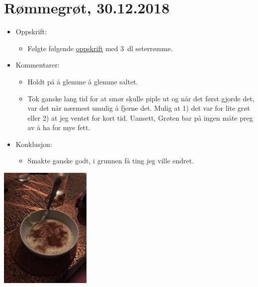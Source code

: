 \documentclass[12pt]{article}
\begin{document}
\section*{R{\o}mmegr{\o}t, 30.12.2018}
\begin{itemize}
\item Oppskrift:
  \begin{itemize}
  \item F{\o}lgte f{\o}lgende
    \href{https://www.matprat.no/oppskrifter/tradisjon/rommegrot/}{oppskrift}
    med 3~dl seterr{\o}mme.  
  \end{itemize}
\item Kommentarer:
  \begin{itemize}
  \item Holdt p{\aa} {\aa} glemme {\aa} glemme saltet.        
  \item Tok ganske lang tid for at sm{\o}r skulle piple ut og
    n{\aa}r det f{\o}rst gjorde det, var det n{\aa}r n{\ae}rmest umulig
    {\aa} fjerne det. Mulig at 1) det var for lite gr{\o}t eller
    2) at jeg ventet for kort tid. Uansett, Gr{\o}ten bar p{\aa}
    ingen m{\aa}te preg av {\aa} ha for mye fett.
  \end{itemize}
\item Konklusjon:
  \begin{itemize}
  \item Smakte ganske godt, i grunnen f{\aa} ting jeg ville endret.
  \end{itemize}
\end{itemize}
\centering
\includegraphics[width=0.33\textwidth]{30-12-2018.jpg}
\end{document}
